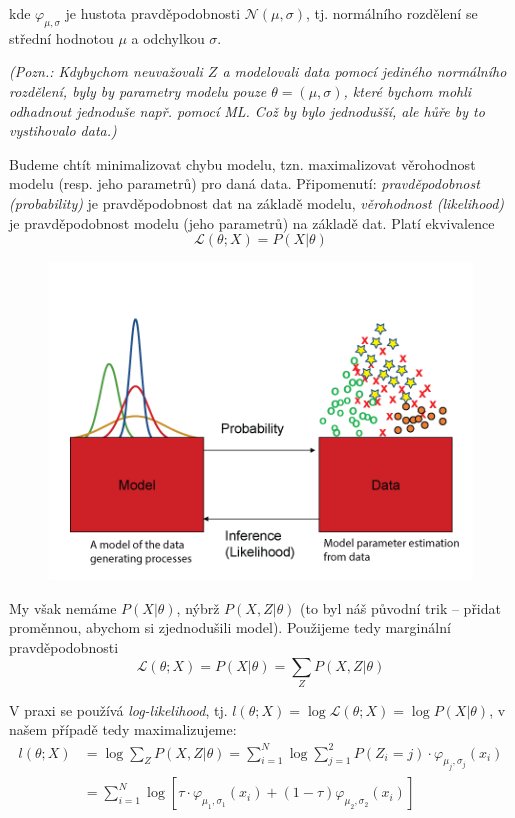 \documentclass[11pt]{report} %
\numberwithin{equation}{section}
\begin{document}
kde $\varphi_{\mu,\sigma}$ je hustota pravděpodobnosti $\mathcal{N}(\mu,\sigma)$, tj. normálního rozdělení se střední hodnotou $\mu$ a odchylkou $\sigma$.

\textit{(Pozn.: Kdybychom neuvažovali $Z$ a modelovali data pomocí jediného normálního rozdělení, byly by parametry modelu pouze $\theta = (\mu,\sigma)$, které bychom mohli odhadnout jednoduše např. pomocí ML. Což by bylo jednodušší, ale hůře by to vystihovalo data.)}

Budeme chtít minimalizovat chybu modelu, tzn. maximalizovat věrohodnost modelu (resp. jeho parametrů) pro daná data. Připomenutí: \textit{pravděpodobnost (probability)} je pravděpodobnost dat na základě modelu, \textit{věrohodnost (likelihood)} je pravděpodobnost modelu (jeho parametrů) na základě dat. Platí ekvivalence
$$\mathcal{L}(\theta;X) = P(X|\theta)$$

\begin{figure}[H]
\centering
\includegraphics[scale=0.6]{img/likelihood.png}
\end{figure}

My však nemáme $P(X|\theta)$, nýbrž $P(X,Z|\theta)$ (to byl náš původní trik -- přidat proměnnou, abychom si zjednodušili model). Použijeme tedy marginální pravděpodobnosti
$$\mathcal{L}(\theta;X) = P(X|\theta) = \sum_{Z}P(X,Z|\theta)$$

V praxi se používá \textit{log-likelihood}, tj. $l(\theta;X) = \log \mathcal{L}(\theta;X) = \log P(X|\theta)$, v našem případě tedy maximalizujeme:
\begin{align*}
l(\theta;X) &= \log\sum_{Z}P(X,Z|\theta) = \sum_{i=1}^{N} \log\sum_{j=1}^{2}P(Z_i=j)\cdot\varphi_{\mu_j,\sigma_j}(x_i)\\
&=\sum_{i=1}^{N} \log[\tau\cdot \varphi_{\mu_1,\sigma_1}(x_i) + (1 - \tau)\varphi_{\mu_2,\sigma_2}(x_i)]\\
\end{align*}
\end{document}
